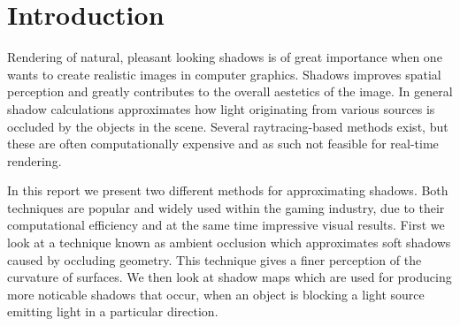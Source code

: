 \section{Introduction}

Rendering of natural, pleasant looking shadows is of great importance
when one wants to create realistic images in computer
graphics. Shadows improves spatial perception and greatly contributes
to the overall aestetics of the image. In general shadow calculations
approximates how light originating from various sources is occluded by
the objects in the scene. Several raytracing-based methods exist,
but these are often computationally expensive and as such not feasible
for real-time rendering. 

In this report we present two different methods for approximating
shadows. Both techniques are popular and widely used within the gaming
industry, due to their computational efficiency and at the same time
impressive visual results. First we look at a technique known as
ambient occlusion which approximates soft shadows caused by occluding
geometry. This technique gives a finer perception of the curvature of
surfaces. We then look at shadow maps which are used for producing
more noticable shadows that occur, when an object is blocking a
light source emitting light in a particular direction.

